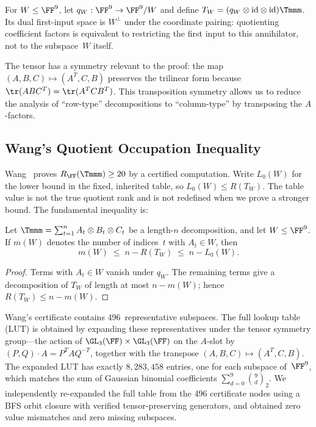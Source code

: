 \documentclass[11pt,a4paper]{article}
\begin{document}
For $W\le\FF^9$, let $q_W:\FF^9\to\FF^9/W$ and define
$T_W=(q_W\otimes\mathrm{id}\otimes\mathrm{id})\Tmmm$.
Its dual first-input space is $W^\perp$ under the coordinate pairing:
quotienting coefficient factors is equivalent to restricting the first
input to this annihilator, not to the subspace~$W$ itself.

The tensor has a symmetry relevant to the proof: the map $(A,B,C)\mapsto(A^T,C,B)$ preserves the trilinear form because $\tr(ABC^T)=\tr(A^TCB^T)$.  This transposition symmetry allows us to reduce the analysis of ``row-type'' decompositions to ``column-type'' by transposing the $A$-factors.

\subsection{Wang's Quotient Occupation Inequality}

Wang~\cite{wangautomated} proves $R_{\FF}(\Tmmm)\ge20$ by a certified computation. Write $L_0(W)$ for the lower bound in the fixed, inherited table, so $L_0(W)\le R(T_W)$. The table value is not the true quotient rank and is not redefined when we prove a stronger bound. The fundamental inequality is:

\begin{proposition}\label{prop:occupation}
  Let $\Tmmm=\sum_{t=1}^n A_t\otimes B_t\otimes C_t$ be a length-$n$ decomposition, and let $W\le\FF^9$.  If $m(W)$ denotes the number of indices~$t$ with $A_t\in W$, then
  \begin{equation}\label{eq:occ}
    m(W)\;\le\; n-R(T_W)\;\le\;n-L_0(W).
  \end{equation}
\end{proposition}

\begin{proof}
  Terms with $A_t\in W$ vanish under $q_W$. The remaining terms give a decomposition of $T_W$ of length at most $n-m(W)$; hence $R(T_W)\le n-m(W)$.
\end{proof}

Wang's certificate contains 496~representative subspaces.  The full lookup table (LUT) is obtained by expanding these representatives under the tensor symmetry group---the action of $\GL_3(\FF)\times\GL_3(\FF)$ on the $A$-slot by $(P,Q)\cdot A = P^TAQ^{-T}$, together with the transpose $(A,B,C)\mapsto(A^T,C,B)$.  The expanded LUT has exactly $8{,}283{,}458$ entries, one for each subspace of~$\FF^9$, which matches the sum of Gaussian binomial coefficients $\sum_{d=0}^9\binom{9}{d}_2$.  We independently re-expanded the full table from the 496 certificate nodes using a BFS orbit closure with verified tensor-preserving generators, and obtained zero value mismatches and zero missing subspaces.
\end{document}
